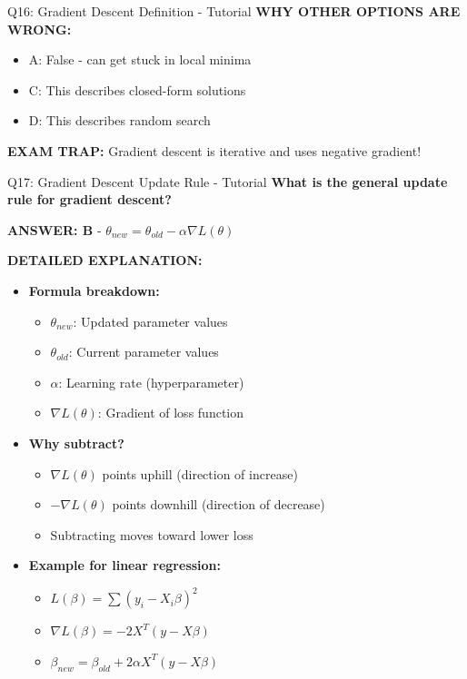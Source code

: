 \documentclass[8pt]{beamer}
\begin{document}
\begin{frame}{Q16: Gradient Descent Definition - Tutorial}
		\vspace{0.05cm}
		\textcolor{myred}{\textbf{WHY OTHER OPTIONS ARE WRONG:}}
		\begin{itemize}
			\item \textcolor{myred}{A:} False - can get stuck in local minima
			\item \textcolor{myred}{C:} This describes closed-form solutions
			\item \textcolor{myred}{D:} This describes random search
		\end{itemize}
		
		\textcolor{myred}{\textbf{EXAM TRAP:}} Gradient descent is \textcolor{myblue}{iterative} and uses \textcolor{myblue}{negative gradient}!
	\end{frame}
	
	\begin{frame}{Q17: Gradient Descent Update Rule - Tutorial}
		\fontsize{6.5}{7.5}\selectfont
		\textbf{What is the general update rule for gradient descent?}
		
		\vspace{0.05cm}
		\textcolor{myblue}{\textbf{ANSWER: B}} - $\theta_{new} = \theta_{old} - \alpha \nabla L(\theta)$
		
		\vspace{0.05cm}
		\textbf{DETAILED EXPLANATION:}
		\begin{itemize}
			\item \textbf{Formula breakdown:}
			\begin{itemize}
				\item $\theta_{new}$: Updated parameter values
				\item $\theta_{old}$: Current parameter values
				\item $\alpha$: Learning rate (hyperparameter)
				\item $\nabla L(\theta)$: Gradient of loss function
			\end{itemize}
			\item \textbf{Why subtract?}
			\begin{itemize}
				\item $\nabla L(\theta)$ points uphill (direction of increase)
				\item $-\nabla L(\theta)$ points downhill (direction of decrease)
				\item Subtracting moves toward lower loss
			\end{itemize}
			\item \textbf{Example for linear regression:}
			\begin{itemize}
				\item $L(\beta) = \sum (y_i - X_i\beta)^2$
				\item $\nabla L(\beta) = -2X^T(y - X\beta)$
				\item $\beta_{new} = \beta_{old} + 2\alpha X^T(y - X\beta)$
			\end{itemize}
		\end{itemize}
		

\end{frame}
\end{document}
